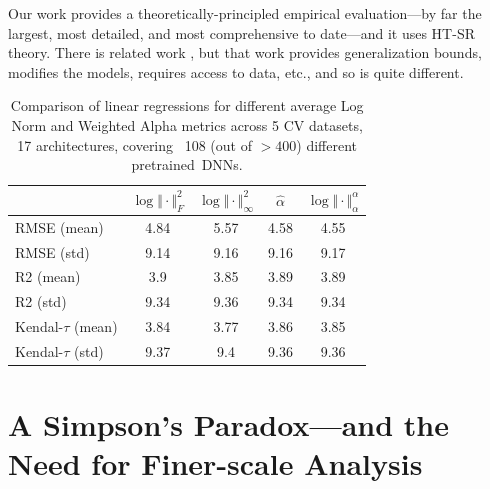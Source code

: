 \documentclass{article}
\begin{document}
Our work provides a theoretically-principled empirical evaluation---by far the largest, most detailed, and most comprehensive to date---and it uses HT-SR theory.
%
There is related work \citep{BFT17_TR,LMBx18_TR}, but that work provides generalization bounds, modifies the models, requires access to data, etc., and so is quite different.



\begin{table}[t]
\small
\begin{center}
\begin{tabular}{|p{0.83in}|c|c|c|c|}
\hline
  & $\log\Vert\cdot\Vert^{2}_{F}$ & $\log\Vert\cdot\Vert^{2}_{\infty}$ & $\hat{\alpha}$ & $\log\Vert\cdot\Vert^{\alpha}_{\alpha}$ \\
\hline

RMSE (mean) & 4.84 & 5.57 & 4.58& 4.55 \\
RMSE (std) & 9.14 & 9.16 & 9.16& 9.17 \\
\hline
R2 (mean) & 3.9 & 3.85 & 3.89& 3.89 \\
R2 (std) & 9.34 & 9.36 & 9.34& 9.34 \\
\hline
Kendal-$\tau$ (mean) & 3.84 & 3.77 & 3.86& 3.85 \\
Kendal-$\tau$ (std) & 9.37 & 9.4 & 9.36& 9.36 \\
\hline

\hline
\end{tabular}
\end{center}
\caption{Comparison of linear regressions for different average Log Norm and Weighted Alpha metrics across 5 CV datasets, 17 architectures, covering \
108 (out of $>400$) different pretrained~DNNs.
}
\label{table:results}
\end{table}


\section*{A Simpson's Paradox---and the Need for Finer-scale Analysis}

%
%
\end{document}
